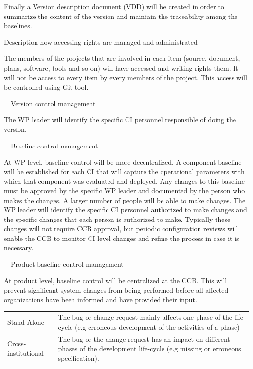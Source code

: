 \documentclass{template/openetcs_article}
\begin{document}
Finally a Version description document (VDD) will be created in order to summarize the content of the version and maintain the traceability among the baselines.

Description how accessing rights are managed and administrated

The members of the projects that are involved in each item (source, document, plans, software, tools and so on) will have accessed and writing rights them. It will not be access to every item by every members of the project. This access will be controlled using Git tool.



{\textbullet}\ \ Version control management

The WP leader will identify the specific CI personnel responsible of doing the version.



{\textbullet}\ \ Baseline control management

At WP level, baseline control will be more decentralized.  A component baseline will be established for each CI that will capture the operational parameters with which that component was evaluated and deployed.  Any changes to this baseline must be approved by the specific WP leader and documented by the person who makes the changes. A larger number of people will be able to make changes. The WP leader will identify the specific CI personnel authorized to make changes and the specific changes that each person is authorized to make. Typically these changes will not require CCB approval, but periodic configuration reviews will enable the CCB to monitor CI level changes and refine the process in case it is necessary.


{\textbullet}\ \ Product baseline control management

At product level, baseline control will be centralized at the CCB. This will prevent significant system changes from being performed before all affected organizations have been informed and have provided their input.


\begin{tabular}{|m{3cm}|m{11cm}|}
\hline
\rowcolor{myblue}
\multicolumn{2}{|c|}{Scope}\\\hline
Stand Alone &
The bug or change request mainly affects one phase of the life-cycle (e.g erroneous development of the activities of a phase)\\\hline
Cross-institutional &
The bug or the change request has an impact on different phases of the development life-cycle (e.g missing or erroneous specification).\\\hline
\end{tabular}
\end{document}
